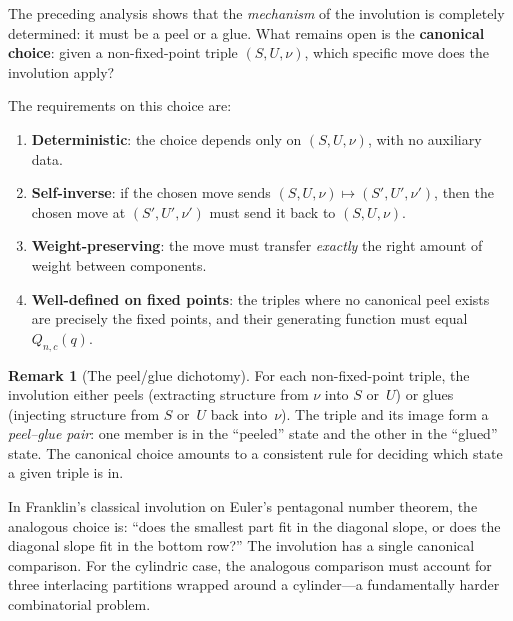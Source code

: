 \documentclass[11pt]{article}
\theoremstyle{plain}
\theoremstyle{definition}
\newtheorem{remark}[theorem]{Remark}
\begin{document}
The preceding analysis shows that the \emph{mechanism} of the
involution is completely determined: it must be a peel or a glue.
What remains open is the \textbf{canonical choice}: given a
non-fixed-point triple $(S, U, \nu)$, which specific move does the
involution apply?

The requirements on this choice are:
\begin{enumerate}
  \item \textbf{Deterministic}: the choice depends only on
    $(S, U, \nu)$, with no auxiliary data.
  \item \textbf{Self-inverse}: if the chosen move sends
    $(S, U, \nu) \mapsto (S', U', \nu')$, then the chosen move at
    $(S', U', \nu')$ must send it back to $(S, U, \nu)$.
  \item \textbf{Weight-preserving}: the move must transfer
    \emph{exactly} the right amount of weight between components.
  \item \textbf{Well-defined on fixed points}: the triples where no
    canonical peel exists are precisely the fixed points, and their
    generating function must equal~$Q_{n,c}(q)$.
\end{enumerate}

\begin{remark}[The peel/glue dichotomy]
For each non-fixed-point triple, the involution either peels (extracting
structure from $\nu$ into $S$ or~$U$) or glues (injecting structure from
$S$ or~$U$ back into~$\nu$).  The triple and its image form a
\emph{peel--glue pair}: one member is in the ``peeled'' state and the
other in the ``glued'' state.  The canonical choice amounts to a
consistent rule for deciding which state a given triple is in.

In Franklin's classical involution on Euler's pentagonal number theorem,
the analogous choice is: ``does the smallest part fit in the diagonal
slope, or does the diagonal slope fit in the bottom row?''  The
involution has a single canonical comparison.  For the cylindric case,
the analogous comparison must account for three interlacing partitions
wrapped around a cylinder---a fundamentally harder combinatorial
problem.
\end{remark}
\end{document}
